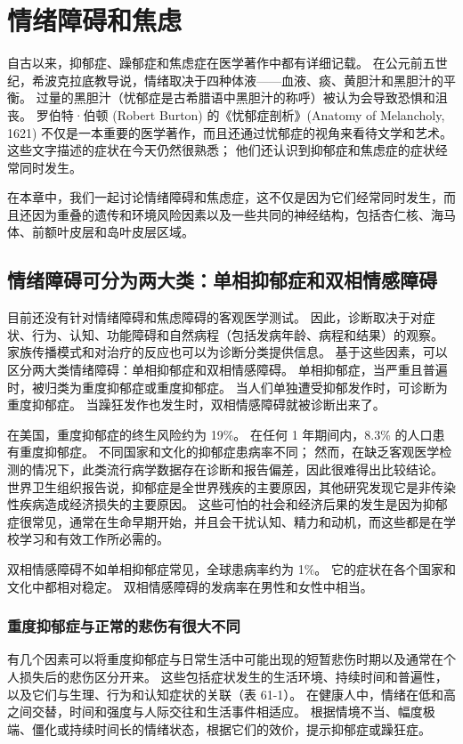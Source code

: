 \chapter{情绪障碍和焦虑}

自古以来，抑郁症、躁郁症和焦虑症在医学著作中都有详细记载。 在公元前五世纪，希波克拉底教导说，情绪取决于四种体液——血液、痰、黄胆汁和黑胆汁的平衡。 过量的黑胆汁（忧郁症是古希腊语中黑胆汁的称呼）被认为会导致恐惧和沮丧。 罗伯特·伯顿 (Robert Burton) 的《忧郁症剖析》(Anatomy of Melancholy, 1621) 不仅是一本重要的医学著作，而且还通过忧郁症的视角来看待文学和艺术。 这些文字描述的症状在今天仍然很熟悉； 他们还认识到抑郁症和焦虑症的症状经常同时发生。

在本章中，我们一起讨论情绪障碍和焦虑症，这不仅是因为它们经常同时发生，而且还因为重叠的遗传和环境风险因素以及一些共同的神经结构，包括杏仁核、海马体、前额叶皮层和岛叶皮层区域。

\section{情绪障碍可分为两大类：单相抑郁症和双相情感障碍}
目前还没有针对情绪障碍和焦虑障碍的客观医学测试。 因此，诊断取决于对症状、行为、认知、功能障碍和自然病程（包括发病年龄、病程和结果）的观察。 家族传播模式和对治疗的反应也可以为诊断分类提供信息。 基于这些因素，可以区分两大类情绪障碍：单相抑郁症和双相情感障碍。 单相抑郁症，当严重且普遍时，被归类为重度抑郁症或重度抑郁症。 当人们单独遭受抑郁发作时，可诊断为重度抑郁症。 当躁狂发作也发生时，双相情感障碍就被诊断出来了。

在美国，重度抑郁症的终生风险约为 19\%。 在任何 1 年期间内，8.3\% 的人口患有重度抑郁症。 不同国家和文化的抑郁症患病率不同； 然而，在缺乏客观医学检测的情况下，此类流行病学数据存在诊断和报告偏差，因此很难得出比较结论。 世界卫生组织报告说，抑郁症是全世界残疾的主要原因，其他研究发现它是非传染性疾病造成经济损失的主要原因。 这些可怕的社会和经济后果的发生是因为抑郁症很常见，通常在生命早期开始，并且会干扰认知、精力和动机，而这些都是在学校学习和有效工作所必需的。

双相情感障碍不如单相抑郁症常见，全球患病率约为 1\%。 它的症状在各个国家和文化中都相对稳定。 双相情感障碍的发病率在男性和女性中相当。

\subsection{重度抑郁症与正常的悲伤有很大不同}
有几个因素可以将重度抑郁症与日常生活中可能出现的短暂悲伤时期以及通常在个人损失后的悲伤区分开来。 这些包括症状发生的生活环境、持续时间和普遍性，以及它们与生理、行为和认知症状的关联（表 61-1）。 在健康人中，情绪在低和高之间交替，时间和强度与人际交往和生活事件相适应。 根据情境不当、幅度极端、僵化或持续时间长的情绪状态，根据它们的效价，提示抑郁症或躁狂症。

